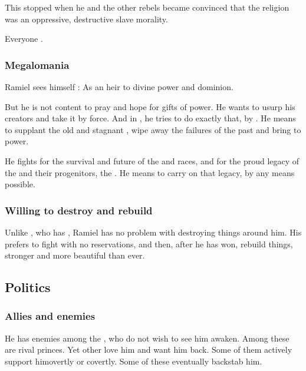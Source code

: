 This stopped when he and the other rebels became convinced that the \Merkyran{} religion was an oppressive, destructive slave morality. 

Everyone .





\subsubsection{Megalomania}
Ramiel sees himself : 
As an heir to divine power and dominion. 

But he is not content to pray and hope for gifts of power. 
He wants to usurp his creators and take it by force. 
And in \SentinelsFinalBook, he tries to do exactly that, by . 
He means to supplant the old and stagnant \banes{}, wipe away the failures of the past and bring  to power. 

He fights for the survival and future of the \resphan{} and \human{} races, and for the proud legacy of the \banes{} and their progenitors, the \voyagers. 
He means to carry on that legacy, by any means possible.





\subsubsection{Willing to destroy and rebuild}
Unlike \Nzessuacrith, who has , Ramiel has no problem with destroying things around him. 
His prefers to fight with no reservations, and then, after he has won, rebuild things, stronger and more beautiful than ever. 









\subsection{Politics}
\subsubsection{Allies and enemies}
He has enemies among the \resphain, who do not wish to see him awaken. Among these are rival \Mystraacht{} princes. Yet other \resphain{} love him and want him back. Some of them actively support him\dash overtly or covertly. Some of these eventually backstab him. 

